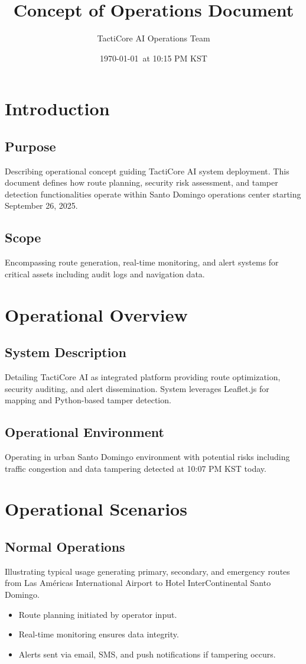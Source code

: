 \documentclass[a4paper,12pt]{report}
\title{Concept of Operations Document}
\author{TactiCore AI Operations Team}
\date{\today\ at 10:15 PM KST}
\begin{document}
\maketitle
\thispagestyle{empty}
\clearpage

\tableofcontents
\clearpage

\chapter{Introduction}
\section{Purpose}
Describing operational concept guiding TactiCore AI system deployment. This document defines how route planning, security risk assessment, and tamper detection functionalities operate within Santo Domingo operations center starting September 26, 2025.

\section{Scope}
Encompassing route generation, real-time monitoring, and alert systems for critical assets including audit logs and navigation data.

\chapter{Operational Overview}
\section{System Description}
Detailing TactiCore AI as integrated platform providing route optimization, security auditing, and alert dissemination. System leverages Leaflet.js for mapping and Python-based tamper detection.

\section{Operational Environment}
Operating in urban Santo Domingo environment with potential risks including traffic congestion and data tampering detected at 10:07 PM KST today.

\chapter{Operational Scenarios}
\section{Normal Operations}
Illustrating typical usage generating primary, secondary, and emergency routes from Las Américas International Airport to Hotel InterContinental Santo Domingo.
\begin{itemize}[leftmargin=*]
    \item Route planning initiated by operator input.
    \item Real-time monitoring ensures data integrity.
    \item Alerts sent via email, SMS, and push notifications if tampering occurs.
\end{itemize}
\end{document}

